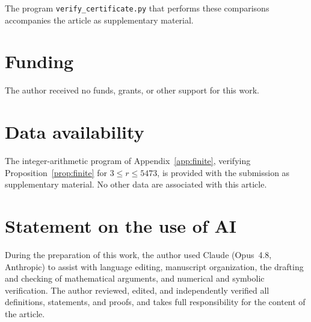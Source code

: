 \documentclass{birkjour}
\theoremstyle{definition}
\theoremstyle{remark}
\begin{document}
The program \texttt{verify\_certificate.py} that performs
these comparisons accompanies the article as supplementary
material.

\section*{Funding}
The author received no funds, grants, or other support for this
work.

\section*{Data availability}
The integer-arithmetic program of Appendix~\ref{app:finite},
verifying Proposition~\ref{prop:finite} for $3\le r\le 5473$,
is provided with the submission as supplementary material. No
other data are associated with this article.

\section*{Statement on the use of AI}
During the preparation of this work, the author used Claude
(Opus~4.8, Anthropic) to assist with language editing,
manuscript organization, the drafting and checking of
mathematical arguments, and numerical and symbolic
verification. The author reviewed, edited, and independently
verified all definitions, statements, and proofs, and takes
full responsibility for the content of the article.
\end{document}
